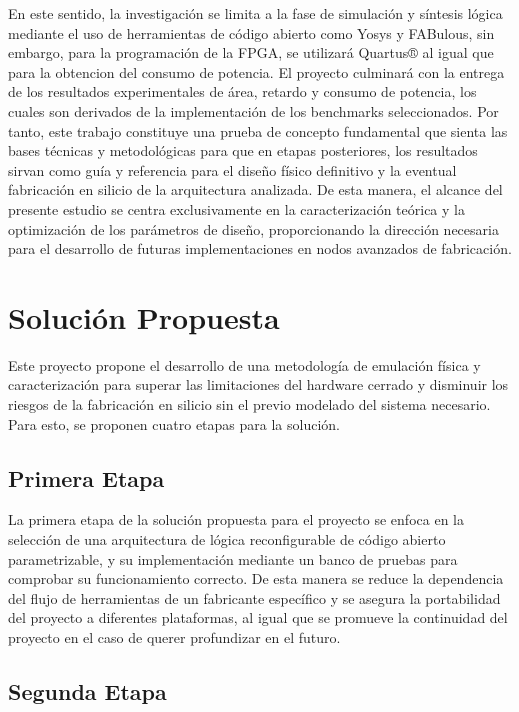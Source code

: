En este sentido, la investigación se limita a la fase de simulación y síntesis lógica mediante 
el uso de herramientas de código abierto como Yosys y FABulous, sin embargo, para la programación
de la FPGA, se utilizará Quartus® al igual que para la obtencion del consumo de potencia. El proyecto culminará con la 
entrega de los resultados experimentales de área, retardo y consumo de potencia, los cuales 
son derivados de la implementación de los benchmarks seleccionados. Por tanto, este trabajo 
constituye una prueba de concepto fundamental que sienta las bases técnicas y metodológicas 
para que en etapas posteriores, los resultados sirvan como guía y referencia para el diseño 
físico definitivo y la eventual fabricación en silicio de la arquitectura analizada. De esta 
manera, el alcance del presente estudio se centra exclusivamente en la caracterización teórica 
y la optimización de los parámetros de diseño, proporcionando la dirección necesaria para el 
desarrollo de futuras implementaciones en nodos avanzados de fabricación.

\section{Solución Propuesta}


Este proyecto propone el desarrollo de una metodología de emulación física y caracterización para 
superar las limitaciones del hardware cerrado y disminuir los riesgos de la fabricación en 
silicio sin el previo modelado del sistema necesario. 
Para esto, se proponen cuatro etapas para la solución.

\subsection{Primera Etapa}

La primera etapa de la solución propuesta para el proyecto se enfoca en la selección de 
una arquitectura de lógica reconfigurable de código abierto parametrizable, y su 
implementación mediante un banco de pruebas para comprobar su funcionamiento correcto. De 
esta manera se reduce la dependencia del flujo de herramientas de un fabricante específico 
y se asegura la portabilidad del proyecto a diferentes plataformas, al igual que se promueve 
la continuidad del proyecto en el caso de querer profundizar en el futuro.

\subsection{Segunda Etapa}

